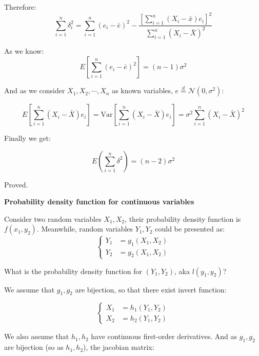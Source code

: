 \documentclass{article}
\newcommand{\Var}{\mathrm{Var}}
\begin{document}
Therefore:
\begin{equation}
\sum_{i=1}^n\delta_i^2=\sum_{i=1}^n(e_i-\bar{e})^2-\frac{[\sum_{i=1}^n(X_i-\bar{x})e_i]^2}{\sum_{i=1}^n(X_i-\bar{X})^2}
\end{equation}

As we know:
\begin{equation}
E[\sum_{i=1}^n(e_i-\bar{e})^2]=(n-1)\sigma^2
\end{equation}

And as we consider $X_1, X_2, \cdots, X_n$ as known variables, \(e\stackrel{d}{=}\mathcal{N}(0, \sigma^2)\):

\begin{equation}
E[\sum_{i=1}^n(X_i-\bar{X})e_i]=\Var{[\sum_{i=1}^n(X_i-\bar{X})e_i]}=\sigma^2\sum_{i=1}^n(X_i-\bar{X})^2
\end{equation}

Finally we get:

\begin{equation}
E(\sum_{i=1}^n\delta^2)=(n-2)\sigma^2
\end{equation}

Proved.

\textbf{Probability density function for continuous variables}

Consider two random variables \(X_1, X_2\), their probability density function is \(f(x_1, y_2)\).
Meanwhile, random variables \(Y_1, Y_2\) could be presented as:
\begin{equation} 
\left\{
\begin{split}
Y_1&=g_1(X_1, X_2)\\
Y_2&=g_2(X_1, X_2)
\end{split}
\right.
\end{equation}

What is the probability density function for \((Y_1, Y_2)\), aka \(l(y_1, y_2)\)?

We assume that \(g_1, g_2\) are bijection, so that there exist invert function:

\begin{equation}
\left\{
\begin{split}
    X_1&=h_1(Y_1, Y_2)\\
    X_2&=h_2(Y_1, Y_2)
\end{split}
\right.
\end{equation}

We also assume that \(h_1, h_2\) have continuous first-order derivatives. And as \(g_1, g_2\) are
bijection (so as \(h_1, h_2\)), the jacobian matrix:
\end{document}
